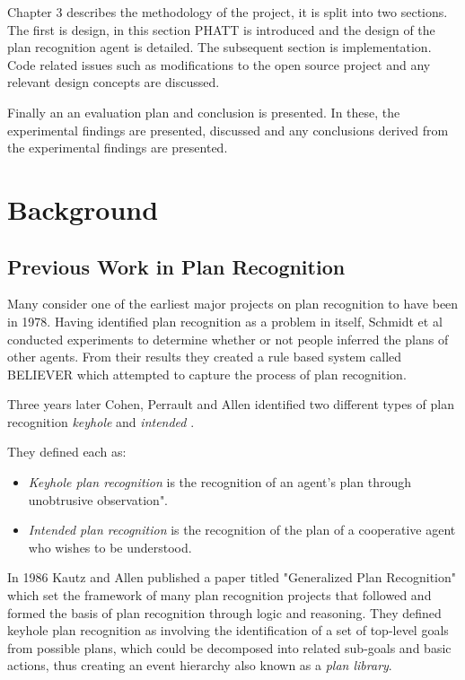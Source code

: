 \documentclass[parskip]{cs4rep}
\begin{document}
Chapter 3 describes the methodology of the project, it is split into two sections. The first is design, in this section PHATT is introduced and the design of the plan recognition agent is detailed. The subsequent section is implementation. Code related issues such as modifications to the open source project and any relevant design concepts are discussed. 

Finally an an evaluation plan and conclusion is presented. In these, the experimental findings are presented, discussed and any conclusions derived from the experimental findings are presented.

\chapter{Background}

\section{Previous Work in Plan Recognition}

Many consider one of the earliest major projects on plan recognition to have been in 1978. Having identified plan recognition as a problem in itself, Schmidt et al \cite{journals/ai/SchmidtSG78} conducted experiments to determine whether or not people inferred the plans of other agents. From their results they created a rule based system called BELIEVER which attempted to capture the process of plan recognition. 

Three years later Cohen, Perrault and Allen identified two different types of plan recognition \textit{keyhole} and \textit{intended} \cite{Cohen82a}. 

They defined each as:

\begin{itemize}
\item
\textit{Keyhole plan recognition} is the recognition of an agent's plan through unobtrusive observation".
\item
\textit{Intended plan recognition} is the recognition of the plan of a cooperative agent who wishes to be understood.
\newline
\end{itemize}

In 1986 Kautz and Allen published a paper titled "Generalized Plan Recognition" \cite{conf/aaai/KautzA86} which set the framework of many plan recognition projects that followed and formed the basis of plan recognition through logic and reasoning. They defined keyhole plan recognition as involving the identification of a set of top-level goals from possible plans, which could be decomposed into related sub-goals and basic actions, thus creating an event hierarchy also known as a \textit{plan library}. 
\end{document}
